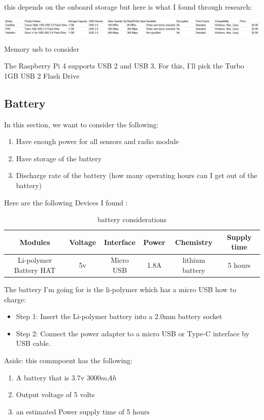 this depends on the onboard storage but here is what I found through research:
\begin{table}[h!]
	\centering
	\includegraphics[width=0.8\linewidth]{Images/memory_devices.png}
	\caption{Memory usb to consider}
	\label{Memory usb to consider}
\end{table}
The Raspberry Pi 4 supports USB 2 and  USB 3. For this, I'll pick the Turbo 1GB USB 2 Flash Drive

\subsection{Battery}
In this section, we want to consider the  following:
\begin{enumerate}
	\item Have enough power for all  sensors  and  radio module
	\item Have storage of the battery
	\item Discharge rate of the  battery (how many operating hours can I get out of the  battery)
\end{enumerate}
Here are the following  Devices I found :
\begin{table}[h!]
	\centering
	\begin{tabular}{|c|c|c|c|c|c|}
		\hline
		Modules & Voltage & Interface & Power & Chemistry & Supply time\\
		\hline
			Li-polymer Battery HAT  & 5v & Micro USB & 1.8A &lithium battery &5 hours \\ \hline
	\end{tabular}
	\caption{battery considerations}
	\label{battery considerations}
\end{table}

The battery I'm going for is the li-polymer which has a micro USB 
how to charge:
\begin{itemize}
	\item Step 1: Insert the Li-polymer battery into a 2.0mm battery socket
	\item Step 2: Connect the power adapter to a micro USB or Type-C interface by USB cable.
\end{itemize}
Aside: this commpoent has the following:
\begin{enumerate}
	\item A battery that is 3.7v 3000$mAh$ 
	\item Output voltage of 5 volts
	\item an estimated Power supply time  of  5 hours
\end{enumerate}
